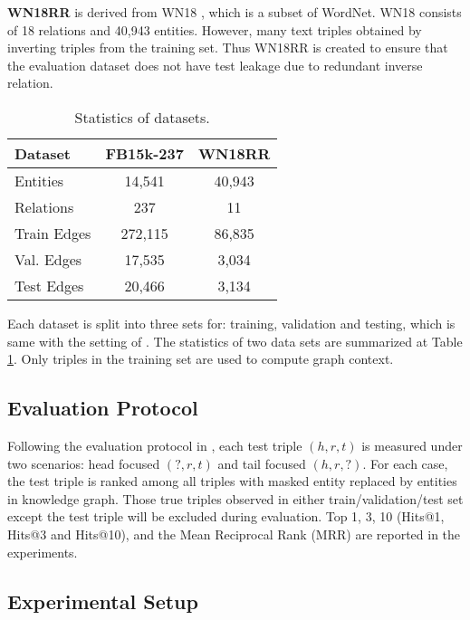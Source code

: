 \documentclass[11pt,a4paper]{article}
\begin{document}
\noindent\textbf{WN18RR} \cite{dettmers2017conve} is derived from WN18 \cite{bordes2013translating}, which is a subset of WordNet. WN18 consists of 18 relations and 40,943 entities. However, many text triples obtained by inverting triples from the training set. Thus WN18RR \cite{dettmers2017conve} is created to ensure that the evaluation dataset does not have test leakage due to redundant inverse relation. 

\begin{table}[!h]
	\begin{center}
		\setlength{\tabcolsep}{2pt}
		\begin{tabular}{|l|c|c|}
\hline
			Dataset & FB15k-237 & WN18RR \\
			\hline
Entities	 & 14,541	& 40,943   \\
			Relations	 & 237 & 11  \\
			Train Edges	 & 272,115 & 86,835  \\
			Val. Edges	 & 17,535 & 3,034  \\
			Test Edges	 & 20,466 & 3,134  \\
\hline
\end{tabular}
		\vspace{-5pt}
		\caption{Statistics of datasets.}\label{tbl:sample}
	\end{center}
\end{table}

Each dataset is split into three sets for: training, validation and testing, which is same with the setting of \cite{Sun2019RotatEKG}. The statistics of two data sets are summarized at Table \ref{tbl:sample}. Only triples in the training set are used to compute graph context.

\subsection{Evaluation Protocol}
Following the evaluation protocol in \cite{dettmers2017conve,Sun2019RotatEKG}, each test triple $(h,r,t)$ is measured under two scenarios: head focused $(?,r,t)$ and tail focused $(h,r,?)$. For each case, the test triple is ranked among all triples with masked entity replaced by entities in knowledge graph. Those true triples observed in either train/validation/test set except the test triple will be excluded during evaluation.  Top 1, 3, 10 (Hits@1, Hits@3 and Hits@10), and the Mean Reciprocal Rank (MRR) are reported in the experiments.


\subsection{Experimental Setup}
\end{document}
